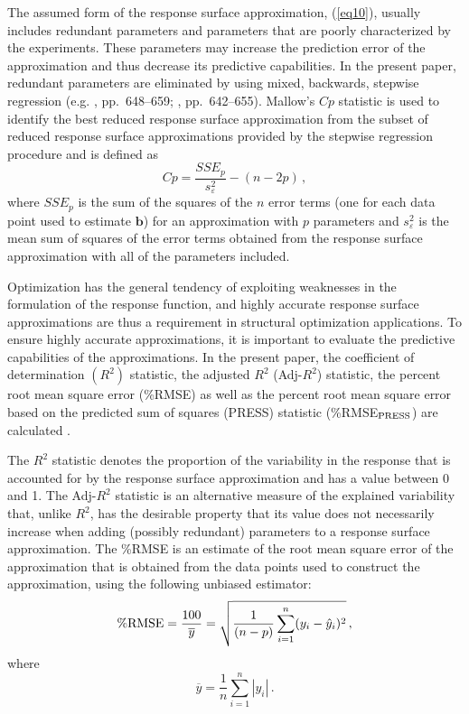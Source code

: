 \documentclass[stropt]{svjour}
\def\kb{\mathbf{b}}%
\begin{document}
The assumed form of the response surface approximation, (\ref{eq10}),
usually includes redundant parameters and parameters that are poorly
characterized by the experiments.
These parameters may increase the prediction error of the approximation and
thus decrease its predictive capabilities.
In the present paper, redundant parameters are eliminated by using mixed,
backwards, stepwise regression (e.g.
\citealt{Ott93}, pp.~648--659; \citealt{Myers95}, pp.~642--655).
Mallow's $Cp$ statistic is used to identify the best reduced response
surface approximation from the subset of reduced response surface
approximations provided by the stepwise regression procedure and is
defined as
\begin{equation}
Cp=\frac{SSE_p}{s_{\varepsilon}^2}-(n-2p)\, ,
\label{eq11}
\end{equation}
where $SSE_p$ is the sum of the squares of the $n$ error terms (one for each
data point used to estimate $\kb$) for an approximation with $p$ parameters
and $s_{\varepsilon}^2$ is the mean sum of squares of the error terms obtained
from the response surface approximation with all of the parameters included.

Optimization has the general tendency of exploiting weaknesses in the
formulation of the response function, and highly accurate response surface
approximations are thus a requirement in structural optimization applications.
To ensure highly accurate approximations, it is important to evaluate the
predictive capabilities of the approximations.
In the present paper, the coefficient of determination $(R^2)$ statistic,
the adjusted $R^2$ (Adj-$R^2$) statistic, the percent root mean square
error (\%RMSE) as well as the percent root mean square error based on the
predicted sum of squares (PRESS) statistic (\%RMSE$_{{\rm PRESS}}$) are
calculated \citep[pp.~28--47]{Myers95}.

The $R^2$ statistic denotes the proportion of the variability in the response
that is accounted for by the response surface approximation and has a value
between 0 and 1.
The Adj-$R^2$ statistic is an alternative measure of the explained variability
that, unlike $R^2$, has the desirable property that its value does not
necessarily increase when adding (possibly redundant) parameters to a
response surface approximation.
The \%RMSE is an estimate of the root mean square error of the approximation
that is obtained from the data points used to construct the approximation,
using the following unbiased estimator:
%
\[
{\rm \%RMSE}=\frac{100}{\overline{y}}=\sqrt{\frac{1}{(n-p)}
\sum\limits_{i=1}^{n}(y_i-\hat{y}_i)^2}\, ,
\]
where
%
\begin{equation}
\overline{y}=\frac1n\sum\limits_{i=1}^{n}| y_i |\, .
\label{eq12}
\end{equation}
\end{document}
